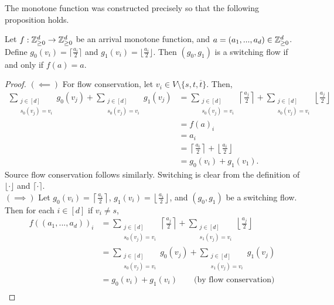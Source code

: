   The monotone function was constructed precisely so that the following proposition holds.
  \begin{prop}
    Let $f : \mathbb{Z}_{\geq 0}^d \to \mathbb{Z}_{\geq 0}^d$ be an arrival monotone function, and $a = (a_1, ..., a_d) \in \mathbb{Z}_{\geq 0}^d$. 
    Define $g_0(v_i) = \lceil \frac{a_i}{2} \rceil$ and $g_1(v_i) = \lfloor \frac{a_i}{2} \rfloor$. 
    Then $(g_0, g_1)$ is a switching flow if and only if $f(a) = a$.
  \end{prop}
  \begin{proof}
    $(\impliedby)$ For flow conservation, let $v_i \in V \setminus \{s, t, \overline{t}\}$. Then,
    \begin{align*}
      \sum_{\substack{j \in [d] \\ s_0(v_j) = v_i}} g_0(v_j) 
      + \sum_{\substack{j \in [d] \\ s_0(v_j) = v_i}} g_1(v_j) &= 
      \sum_{\substack{j \in [d] \\ s_0(v_j) = v_i}}  \left\lceil \frac{a_j}{2} \right\rceil
      + \sum_{\substack{j \in [d] \\ s_0(v_j) = v_i}} \left\lfloor \frac{a_j}{2} \right\rfloor \\
      &= f(a)_i \\ 
      &= a_i \\ 
      &= \left\lceil \frac{a_i}{2}\right\rceil + \left\lfloor \frac{a_i}{2}\right\rfloor \\
      &= g_0(v_i) + g_1(v_1).
    \end{align*}
    Source flow conservation follows similarly. Switching is clear from the definition of $\lfloor \cdot \rfloor$
    and $\lceil \cdot \rceil$. \\
    $(\implies)$ Let $g_0(v_i) = \left\lceil \frac{a_i}{2} \right\rceil$, 
    $g_1(v_i) = \left\lfloor \frac{a_i}{2} \right\rfloor$, and $(g_0, g_1)$ be a switching flow. Then
    for each $i \in [d]$ if $v_i \neq s$,
    \begin{align*}
      f((a_1, ..., a_d))_i &= 
    \sum_{\substack{j \in [d] \\ s_0(v_j) = v_i}} \left\lceil \frac{a_j}{2} \right\rceil
      + \sum_{\substack{j \in [d] \\ s_1(v_j) = v_i}} \left\lfloor \frac{a_j}{2} \right\rfloor \\
      &= \sum_{\substack{j \in [d] \\ s_0(v_j) = v_i}}  g_0(v_j) 
      + \sum_{\substack{j \in [d] \\ s_1(v_j) = v_i}}  g_1(v_j) \\
      &= g_0(v_i) + g_1(v_i) \qquad \text{(by flow conservation)} \\

\end{align*}
\end{proof}
